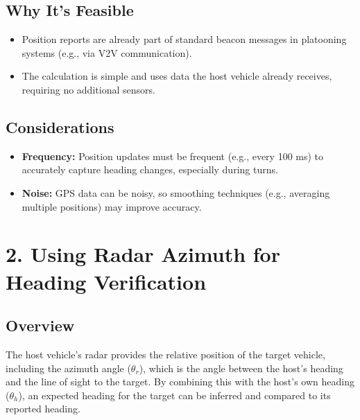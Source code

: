 \documentclass{article}
\begin{document}
\subsection*{Why It's Feasible}
\begin{itemize}
    \item Position reports are already part of standard beacon messages in platooning systems (e.g., via V2V communication).
    \item The calculation is simple and uses data the host vehicle already receives, requiring no additional sensors.
\end{itemize}

\subsection*{Considerations}
\begin{itemize}
    \item \textbf{Frequency:} Position updates must be frequent (e.g., every 100 ms) to accurately capture heading changes, especially during turns.
    \item \textbf{Noise:} GPS data can be noisy, so smoothing techniques (e.g., averaging multiple positions) may improve accuracy.
\end{itemize}

\section*{2. Using Radar Azimuth for Heading Verification}

\subsection*{Overview}
The host vehicle's radar provides the relative position of the target vehicle, including the azimuth angle (\(\theta_r\)), which is the angle between the host's heading and the line of sight to the target. By combining this with the host's own heading (\(\theta_h\)), an expected heading for the target can be inferred and compared to its reported heading.
\end{document}
